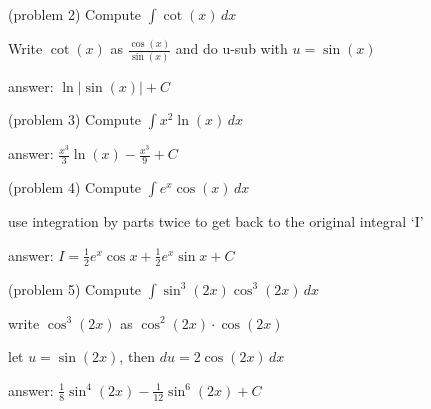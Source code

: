 \documentclass[handout]{ximera}
\begin{document}
\begin{problem}(problem 2)
Compute $\displaystyle \int \cot(x) \, dx$

\begin{hint}
Write $\cot(x)$ as $\frac{\cos(x)}{\sin(x)}$ and do u-sub with $u = \sin(x)$
\end{hint}

\begin{hint}
answer: $\ln|\sin(x)| + C$
\end{hint}

\end{problem}


\begin{problem}(problem 3)
Compute $\displaystyle \int x^2\ln(x) \, dx$

\begin{hint}
answer: $\displaystyle \frac{x^3}{3} \ln(x) - \frac{x^3}{9} + C$
\end{hint}

\end{problem}


\begin{problem}(problem 4)
Compute $\displaystyle \int e^x \cos(x) \, dx$

\begin{hint}
use integration by parts twice to get back to the original integral `I'
\end{hint}

\begin{hint}
answer: $I = \frac12 e^x \cos x + \frac12 e^x \sin x + C$
\end{hint}

\end{problem}


\begin{problem}(problem 5)
Compute $\displaystyle \int \sin^3(2x) \cos^3(2x) \, dx$

\begin{hint}
write $\cos^3(2x)$ as $\cos^2(2x) \cdot \cos(2x)$
\end{hint}

\begin{hint}
let $u = \sin(2x)$, then $du = 2\cos(2x) \, dx$
\end{hint}

\begin{hint}
answer: $\displaystyle \frac18 \sin^4 (2x) - \frac{1}{12} \sin^6 (2x) + C$
\end{hint}

\end{problem}
\end{document}
